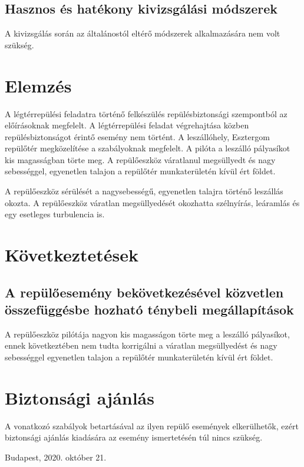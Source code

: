 \documentclass[a4paper,10pt]{article}
\begin{document}
\subsection{Hasznos és hatékony kivizsgálási módszerek}
A kivizsgálás során az általánostól eltérő módszerek alkalmazására nem volt 
szükség.

\section{Elemzés}
A légtérrepülési feladatra történő felkészülés repülésbiztonsági
szempontból az előírásoknak megfelelt. A légtérrepülési feladat
végrehajtása közben repülésbiztonságot érintő esemény nem történt. A 
leszállóhely, Esztergom repülőtér megközelítése a szabályoknak megfelelt. A 
pilóta a leszálló pályasíkot kis magasságban törte meg. A repülőeszköz 
váratlanul megsüllyedt és nagy sebességgel, egyenetlen talajon a repülőtér 
munkaterületén kívül ért földet.

A repülőeszköz sérülését a nagysebességű, egyenetlen talajra történő 
leszállás okozta. A repülőeszköz váratlan megsüllyedését okozhatta
szélnyírás, leáramlás és egy esetleges turbulencia is.

\section{Következtetések}
\subsection{A repülőesemény bekövetkezésével közvetlen összefüggésbe
hozható ténybeli megállapítások}
A repülőeszköz pilótája nagyon kis magasságon törte meg a leszálló
pályasíkot, ennek következtében nem tudta korrigálni a váratlan
megsüllyedést és nagy sebességgel egyenetlen talajon a repülőtér
munkaterületén kívül ért földet.

\section{Biztonsági ajánlás}
A vonatkozó szabályok betartásával az ilyen repülő események elkerülhetők, 
ezért biztonsági ajánlás kiadására az esemény ismertetésén túl nincs 
szükség.

\vspace{1cm}

Budapest, 2020. október 21.
\end{document}
